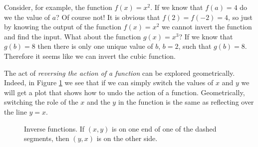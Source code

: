 Consider, for example, the function $f(x) = x^2$.  If we know that $f(a) = 4$ do we the
value of $a$?  Of course not!  It is obvious that $f(2) = f(-2) = 4$, so just by knowing
the output of the function $f(x) = x^2$ we cannot invert the function and find the input.
What about the function $g(x) = x^3$?  If we know that $g(b) = 8$ then there is only one
unique value of $b$, $b=2$, such that $g(b) = 8$.  Therefore it seems like we can invert
the cubic function.  

The act of {\it reversing the action of a function} can be explored geometrically.
Indeed, in Figure \ref{fig:0.3.inv} we see that if we can simply switch the values of $x$
and $y$ we will get a plot that shows how to undo the action of a function. Geometrically,
switching the role of the $x$ and the $y$ in the function is the same as reflecting over
the line $y=x$.
\begin{figure}[h!]
    \begin{center}
    \end{center}
    \caption{Inverse functions. If $(x,y)$ is on one end of one of the dashed segments,
    then $(y,x)$ is on the other side.}
    \label{fig:0.3.inv}
\end{figure}

